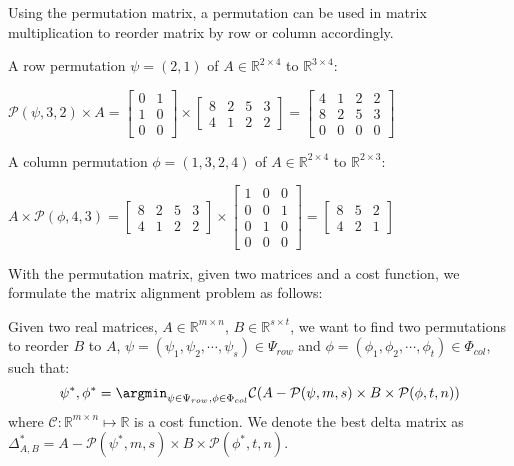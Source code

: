 \documentclass[conference]{IEEEtran}
\begin{document}
{Using the permutation matrix, a permutation can be used in matrix multiplication to reorder matrix by row or column accordingly. 


\begin{example}
A row permutation $\psi = (2, 1)$ of $A \in \mathbb{R}^{2 \times 4}$ to $\mathbb{R}^{3\times 4}$:
\begin{center}
{\small{
$\mathcal{P}(\psi,3,2) \times A = 
\begin{bmatrix} 
0 & 1 \\
1 & 0 \\
0 & 0 
\end{bmatrix} \times
\begin{bmatrix} 
8 & 2 & 5 & 3\\
4 & 1 & 2 & 2
\end{bmatrix}
=
\begin{bmatrix}  
4 & 1 & 2 & 2\\
8 & 2 & 5 & 3\\
0 & 0 & 0 & 0
\end{bmatrix}
$
}}
\end{center}


A column permutation $\phi = (1, 3, 2, 4)$ of $A \in \mathbb{R}^{2 \times 4}$ to $\mathbb{R}^{2\times 3}$:
\begin{center}
$A \times \mathcal{P}(\phi,4,3) = 
\begin{bmatrix} 
8 & 2 & 5 & 3\\
4 & 1 & 2 & 2
\end{bmatrix} \times
\begin{bmatrix} 
1 & 0 & 0  \\
0 & 0 & 1  \\
0 & 1 & 0  \\
0 & 0 & 0  
\end{bmatrix} =
\begin{bmatrix}  
8 & 5 & 2 \\
4 & 2 & 1 
\end{bmatrix}
$
\end{center}
\end{example}


With the permutation matrix, given two matrices and a cost function, we formulate the matrix alignment problem as follows:


\begin{problem}
Given two real matrices, $A \in \mathbb{R}^{m\times n}$, $B \in \mathbb{R}^{s \times t}$, we want to find two permutations to reorder $B$ to $A$, $\psi = (\psi_1, \psi_2, \cdots, \psi_s) \in \Psi_{row}$ and $\phi = (\phi_1, 
\phi_2, \cdots, \phi_t) \in \Phi_{col}$, such that:
\begin{displaymath}
\psi^*, \phi^* = \argmin_{\psi \in \Psi_{row}, \phi \in \Phi_{col}} \mathcal{C}(A - \mathcal{P}(\psi,m,s)\times B \times \mathcal{P}(\phi,t,n))
\end{displaymath}
where $\mathcal{C}: \mathbb{R}^{m \times n} \mapsto \mathbb{R}$ is a cost function. We denote the best delta matrix as $\Delta^*_{A,B} = A - \mathcal{P}(\psi^*,m,s)\times B \times \mathcal{P}(\phi^*,t,n)$.
\end{problem}


}
\end{document}
